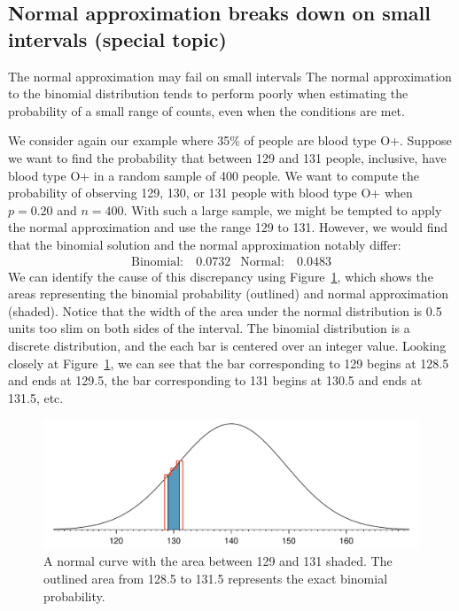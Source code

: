 \subsection{Normal approximation breaks down on small intervals (special topic)}

\begin{onebox}{The normal approximation may fail on small intervals}
{The normal approximation to the binomial distribution tends to perform poorly when estimating the probability of a small range of counts, even when the conditions are met.}
\end{onebox}

We consider again our example where 35\% of people are blood type O+.  Suppose we want to find the probability that between 129 and 131 people, inclusive, have blood type O+ in a random sample of 400 people.  We want to compute the probability of observing 129, 130, or 131 people with blood type O+ when $p=0.20$ and $n=400$.  With such a large sample, we might be tempted to apply the normal approximation and use the range 129 to 131. However, we would find that the binomial solution and the normal approximation notably differ:
\begin{align*}
\text{Binomial:}&\ 0.0732
&\text{Normal:}&\ 0.0483
\end{align*}
We can identify the cause of this discrepancy using Figure~\ref{normApproxToBinomFail}, which shows the areas representing the binomial probability (outlined) and normal approximation (shaded). Notice that the width of the area under the normal distribution is 0.5 units too slim on both sides of the interval. The binomial distribution is a discrete distribution, and the each bar is centered over an integer value. Looking closely at Figure~\ref{normApproxToBinomFail}, we can see that the bar corresponding to 129 begins at 128.5 and ends at 129.5, the bar corresponding to 131 begins at 130.5 and ends at 131.5, etc.

\begin{figure}[h]
\centering
\includegraphics[width=\textwidth]{ch_distributions/figures/normApproxToBinomFail/normApproxToBinomFail-n400-p35}
\caption{A normal curve with the area between 129 and 131 shaded. The outlined area from 128.5 to 131.5 represents the exact binomial probability.}
\label{normApproxToBinomFail}
\end{figure}


